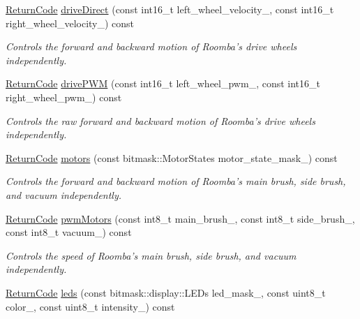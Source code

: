 \begin{DoxyCompactItemize}
\hyperlink{classroomba_1_1series500_1_1_open_interface_a43fc2ae1216e57cfb46901331b9ab4c7}{Return\+Code} \hyperlink{classroomba_1_1series500_1_1_open_interface_aa528b5978d391829da67cc582beac9b9}{drive\+Direct} (const int16\+\_\+t left\+\_\+wheel\+\_\+velocity\+\_\+, const int16\+\_\+t right\+\_\+wheel\+\_\+velocity\+\_\+) const 
\begin{DoxyCompactList}\small\item\em Controls the forward and backward motion of Roomba’s drive wheels independently. \end{DoxyCompactList}\item 
\hyperlink{classroomba_1_1series500_1_1_open_interface_a43fc2ae1216e57cfb46901331b9ab4c7}{Return\+Code} \hyperlink{classroomba_1_1series500_1_1_open_interface_a57c4e739264089ea5982a2f17727d108}{drive\+P\+W\+M} (const int16\+\_\+t left\+\_\+wheel\+\_\+pwm\+\_\+, const int16\+\_\+t right\+\_\+wheel\+\_\+pwm\+\_\+) const 
\begin{DoxyCompactList}\small\item\em Controls the raw forward and backward motion of Roomba’s drive wheels independently. \end{DoxyCompactList}\item 
\hyperlink{classroomba_1_1series500_1_1_open_interface_a43fc2ae1216e57cfb46901331b9ab4c7}{Return\+Code} \hyperlink{classroomba_1_1series500_1_1_open_interface_af15de362597dd006f85ee412ddba7c84}{motors} (const bitmask\+::\+Motor\+States motor\+\_\+state\+\_\+mask\+\_\+) const 
\begin{DoxyCompactList}\small\item\em Controls the forward and backward motion of Roomba’s main brush, side brush, and vacuum independently. \end{DoxyCompactList}\item 
\hyperlink{classroomba_1_1series500_1_1_open_interface_a43fc2ae1216e57cfb46901331b9ab4c7}{Return\+Code} \hyperlink{classroomba_1_1series500_1_1_open_interface_a26faf1f736c1b4743619fc4fa77a9ec9}{pwm\+Motors} (const int8\+\_\+t main\+\_\+brush\+\_\+, const int8\+\_\+t side\+\_\+brush\+\_\+, const int8\+\_\+t vacuum\+\_\+) const 
\begin{DoxyCompactList}\small\item\em Controls the speed of Roomba’s main brush, side brush, and vacuum independently. \end{DoxyCompactList}\item 
\hyperlink{classroomba_1_1series500_1_1_open_interface_a43fc2ae1216e57cfb46901331b9ab4c7}{Return\+Code} \hyperlink{classroomba_1_1series500_1_1_open_interface_afa4fd23e10da8471a69b6ec05a323899}{leds} (const bitmask\+::display\+::\+L\+E\+Ds led\+\_\+mask\+\_\+, const uint8\+\_\+t color\+\_\+, const uint8\+\_\+t intensity\+\_\+) const 

\end{DoxyCompactItemize}

